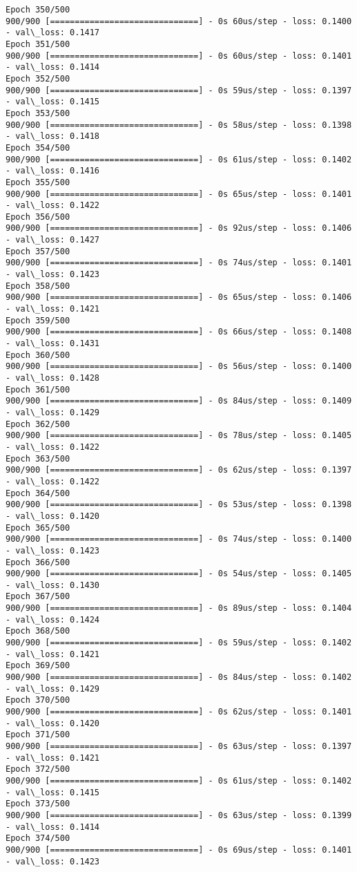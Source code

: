 \documentclass[11pt]{article}
\begin{document}
\begin{Verbatim}[commandchars=\\\{\}]
Epoch 350/500
900/900 [==============================] - 0s 60us/step - loss: 0.1400 - val\_loss: 0.1417
Epoch 351/500
900/900 [==============================] - 0s 60us/step - loss: 0.1401 - val\_loss: 0.1414
Epoch 352/500
900/900 [==============================] - 0s 59us/step - loss: 0.1397 - val\_loss: 0.1415
Epoch 353/500
900/900 [==============================] - 0s 58us/step - loss: 0.1398 - val\_loss: 0.1418
Epoch 354/500
900/900 [==============================] - 0s 61us/step - loss: 0.1402 - val\_loss: 0.1416
Epoch 355/500
900/900 [==============================] - 0s 65us/step - loss: 0.1401 - val\_loss: 0.1422
Epoch 356/500
900/900 [==============================] - 0s 92us/step - loss: 0.1406 - val\_loss: 0.1427
Epoch 357/500
900/900 [==============================] - 0s 74us/step - loss: 0.1401 - val\_loss: 0.1423
Epoch 358/500
900/900 [==============================] - 0s 65us/step - loss: 0.1406 - val\_loss: 0.1421
Epoch 359/500
900/900 [==============================] - 0s 66us/step - loss: 0.1408 - val\_loss: 0.1431
Epoch 360/500
900/900 [==============================] - 0s 56us/step - loss: 0.1400 - val\_loss: 0.1428
Epoch 361/500
900/900 [==============================] - 0s 84us/step - loss: 0.1409 - val\_loss: 0.1429
Epoch 362/500
900/900 [==============================] - 0s 78us/step - loss: 0.1405 - val\_loss: 0.1422
Epoch 363/500
900/900 [==============================] - 0s 62us/step - loss: 0.1397 - val\_loss: 0.1422
Epoch 364/500
900/900 [==============================] - 0s 53us/step - loss: 0.1398 - val\_loss: 0.1420
Epoch 365/500
900/900 [==============================] - 0s 74us/step - loss: 0.1400 - val\_loss: 0.1423
Epoch 366/500
900/900 [==============================] - 0s 54us/step - loss: 0.1405 - val\_loss: 0.1430
Epoch 367/500
900/900 [==============================] - 0s 89us/step - loss: 0.1404 - val\_loss: 0.1424
Epoch 368/500
900/900 [==============================] - 0s 59us/step - loss: 0.1402 - val\_loss: 0.1421
Epoch 369/500
900/900 [==============================] - 0s 84us/step - loss: 0.1402 - val\_loss: 0.1429
Epoch 370/500
900/900 [==============================] - 0s 62us/step - loss: 0.1401 - val\_loss: 0.1420
Epoch 371/500
900/900 [==============================] - 0s 63us/step - loss: 0.1397 - val\_loss: 0.1421
Epoch 372/500
900/900 [==============================] - 0s 61us/step - loss: 0.1402 - val\_loss: 0.1415
Epoch 373/500
900/900 [==============================] - 0s 63us/step - loss: 0.1399 - val\_loss: 0.1414
Epoch 374/500
900/900 [==============================] - 0s 69us/step - loss: 0.1401 - val\_loss: 0.1423

\end{Verbatim}
\end{document}
